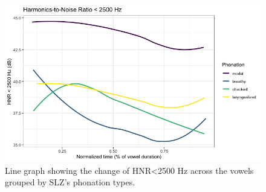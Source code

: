 \documentclass[12pt, letterpaper]{article}
\begin{document}

\begin{figure}[!h]
	\centering
	\includegraphics[width=.75\linewidth]{Images/HNR25.png}
	\caption{Line graph showing the change of HNR\textless 2500 Hz across the vowels grouped by SLZ's phonation types.}
	\label{fig:HNR25}
\end{figure}
\end{document}
